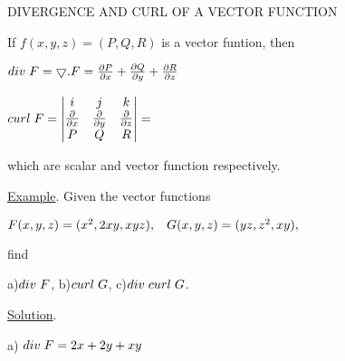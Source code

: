 \documentclass[11pt,a4paper]{article}
\begin{document}
\begin{center}
 DIVERGENCE AND CURL OF A VECTOR FUNCTION
\end{center}

\hspace{1.80cm} If $f(x, y, z) = (P, Q, R)$ is a vector funtion, then

\begin{center}
$div\hspace{0.1cm} F = \bigtriangledown . F = \frac{\partial P}{\partial x} + \frac{\partial Q}{\partial y} + \frac{\partial R}{\partial z} $ \vspace{0.25cm}
\end{center}
\begin{center}
$curl \hspace{0.1cm} F = \begin{vmatrix} 
i & j & k\\
\frac{\partial}{\partial x} & \frac{\partial}{\partial y} & \frac{\partial}{\partial z} \\
P & Q & R
\end{vmatrix} = 
\quad$
\end{center}
which are scalar and vector function respectively. \vspace{0.25cm}

\hspace{1.8cm} \underline{Example}. Given the vector functions 

\begin{center}
$F(x, y, z) = (x^2, 2xy, xyz), \hspace{0.30cm} G(x, y, z) = (yz, z^2, xy),$
\end{center}
find \vspace{0.25cm}

\hspace{1.8cm}   a)$ div \hspace{0.1cm} F$,   \hspace{0.8cm}            b)$ curl \hspace{0.1cm} G$,       \hspace{0.8cm}        c)$ div \hspace{0.1cm} curl \hspace{0.1cm} G$. \vspace{0.25cm}

\hspace{1.8cm} \underline{Solution}. \vspace{0.25cm}

\hspace{1.8cm} a) $div \hspace{0.1cm} F = 2x + 2y + xy$ \vspace{0.25cm}
\end{document}
